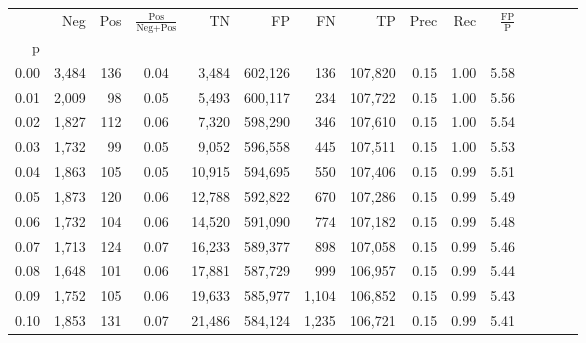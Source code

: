 \begin{tabular}{rrrcrrrrrrrrrrr}
\toprule
{} &     Neg &    Pos & $\frac{\text{Pos}}{\text{Neg}+\text{Pos}}$ &       TN &       FP &       FN &       TP &  Prec &   Rec & $\frac{\text{FP}}{\text{P}}$ \\
p    &         &        &                                            &          &          &          &          &       &       &                              \\
\midrule
0.00 &   3,484 &    136 &                                       0.04 &    3,484 &  602,126 &      136 &  107,820 &  0.15 &  1.00 &                         5.58 \\
0.01 &   2,009 &     98 &                                       0.05 &    5,493 &  600,117 &      234 &  107,722 &  0.15 &  1.00 &                         5.56 \\
0.02 &   1,827 &    112 &                                       0.06 &    7,320 &  598,290 &      346 &  107,610 &  0.15 &  1.00 &                         5.54 \\
0.03 &   1,732 &     99 &                                       0.05 &    9,052 &  596,558 &      445 &  107,511 &  0.15 &  1.00 &                         5.53 \\
0.04 &   1,863 &    105 &                                       0.05 &   10,915 &  594,695 &      550 &  107,406 &  0.15 &  0.99 &                         5.51 \\
0.05 &   1,873 &    120 &                                       0.06 &   12,788 &  592,822 &      670 &  107,286 &  0.15 &  0.99 &                         5.49 \\
0.06 &   1,732 &    104 &                                       0.06 &   14,520 &  591,090 &      774 &  107,182 &  0.15 &  0.99 &                         5.48 \\
0.07 &   1,713 &    124 &                                       0.07 &   16,233 &  589,377 &      898 &  107,058 &  0.15 &  0.99 &                         5.46 \\
0.08 &   1,648 &    101 &                                       0.06 &   17,881 &  587,729 &      999 &  106,957 &  0.15 &  0.99 &                         5.44 \\
0.09 &   1,752 &    105 &                                       0.06 &   19,633 &  585,977 &    1,104 &  106,852 &  0.15 &  0.99 &                         5.43 \\
0.10 &   1,853 &    131 &                                       0.07 &   21,486 &  584,124 &    1,235 &  106,721 &  0.15 &  0.99 &                         5.41 \\

\end{tabular}
